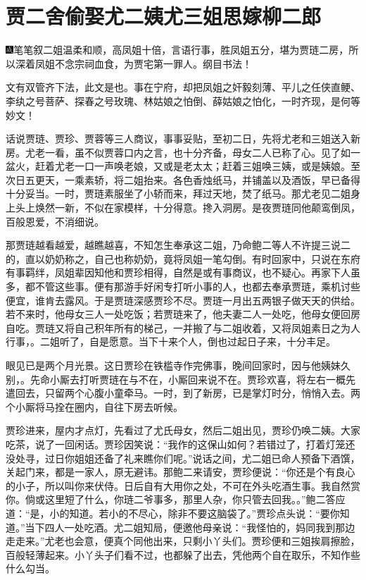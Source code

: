 
\chapter{贾二舍偷娶尤二姨\hspace{.5em}尤三姐思嫁柳二郎}
{\includegraphics[width=3mm]{../Images/00005}\kaishu 笔笔叙二姐温柔和顺，高凤姐十倍，言语行事，胜凤姐五分，堪为贾琏二房，所以深着凤姐不念宗祠血食，为贾宅第一罪人。纲目书法！}

{\kaishu 文有双管齐下法，此文是也。事在宁府，却把凤姐之奸毅刻薄、平儿之任侠直鲠、李纨之号菩萨、探春之号玫瑰、林姑娘之怕倒、薛姑娘之怕化，一时齐现，是何等妙文！}

话说贾琏、贾珍、贾蓉等三人商议，事事妥贴，至初二日，先将尤老和三姐送入新房。尤老一看，虽不似贾蓉口内之言，也十分齐备，母女二人已称了心。见了如一盆火，赶着尤老一口一声唤老娘，又或是老太太；赶着三姐唤三姨，或是姨娘。至次日五更天，一乘素轿，将二姐抬来。各色香烛纸马，并铺盖以及酒饭，早已备得十分妥当。一时，贾琏素服坐了小轿而来，拜过天地，焚了纸马。那尤老见二姐身上头上焕然一新，不似在家模样，十分得意。搀入洞房。是夜贾琏同他颠鸾倒凤，百般恩爱，不消细说。

那贾琏越看越爱，越瞧越喜，不知怎生奉承这二姐，乃命鲍二等人不许提三说二的，直以奶奶称之，自己也称奶奶，竟将凤姐一笔勾倒。有时回家中，只说在东府有事羁绊，凤姐辈因知他和贾珍相得，自然是或有事商议，也不疑心。再家下人虽多，都不管这些事。便有那游手好闲专打听小事的人，也都去奉承贾琏，乘机讨些便宜，谁肯去露风。于是贾琏深感贾珍不尽。贾琏一月出五两银子做天天的供给。若不来时，他母女三人一处吃饭；若贾琏来了，他夫妻二人一处吃，他母女便回房自吃。贾琏又将自己积年所有的梯己，一并搬了与二姐收着，又将凤姐素日之为人行事，。二姐听了，自是愿意。当下十来个人，倒也过起日子来，十分丰足。

眼见已是两个月光景。这日贾珍在铁槛寺作完佛事，晚间回家时，因与他姨妹久别，。先命小厮去打听贾琏在与不在，小厮回来说不在。贾珍欢喜，将左右一概先遣回去，只留两个心腹小童牵马。一时，到了新房，已是掌灯时分，悄悄入去。两个小厮将马拴在圈内，自往下房去听候。

贾珍进来，屋内才点灯，先看过了尤氏母女，然后二姐出见，贾珍仍唤二姨。大家吃茶，说了一回闲话。贾珍因笑说：``我作的这保山如何？若错过了，打着灯笼还没处寻，过日你姐姐还备了礼来瞧你们呢。''说话之间，尤二姐已命人预备下酒馔，关起门来，都是一家人，原无避讳。那鲍二来请安，贾珍便说：``你还是个有良心的小子，所以叫你来伏侍。日后自有大用你之处，不可在外头吃酒生事。我自然赏你。倘或这里短了什么，你琏二爷事多，那里人杂，你只管去回我。。''鲍二答应道：``是，小的知道。若小的不尽心，除非不要这脑袋了。''贾珍点头说：``要你知道。''当下四人一处吃酒。尤二姐知局，便邀他母亲说：``我怪怕的，妈同我到那边走走来。''尤老也会意，便真个同他出来，只剩小丫头们。贾珍便和三姐挨肩擦脸，百般轻薄起来。小丫头子们看不过，也都躲了出去，凭他两个自在取乐，不知作些什么勾当。

